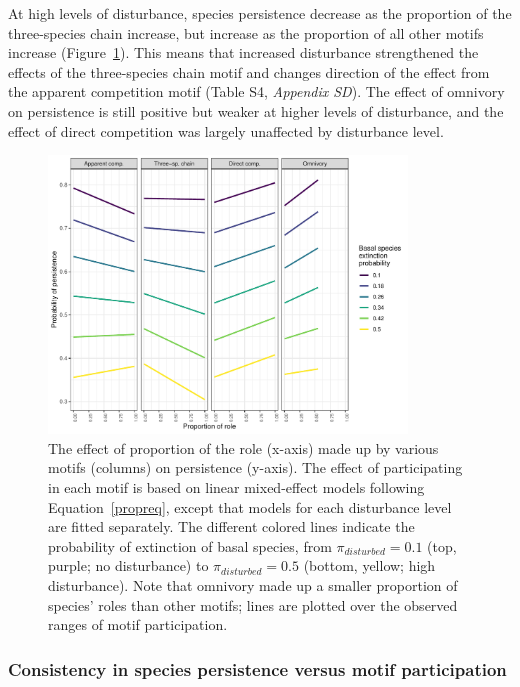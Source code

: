\documentclass[12pt]{article}
\begin{document}
\begin{spacing}{2.0}
        At high levels of disturbance, species persistence decrease as the proportion of the three-species chain increase, but increase as the proportion of all other motifs increase (Figure~\ref{fig:prop_lmer_all}). This means that increased disturbance strengthened the effects of the three-species chain motif and changes direction of the effect from the apparent competition motif  (Table S4, \emph{Appendix SD}). The effect of omnivory on persistence is still positive but weaker at higher levels of disturbance, and the effect of direct competition was largely unaffected by disturbance level.
    
            
            \begin{figure}[h!]
                \centering
                \includegraphics[width=0.85\textwidth]{figures/prop_lmer_allCS.pdf}
                \caption{The effect of proportion of the role (x-axis) made up by various motifs (columns) on persistence (y-axis). The effect of participating in each motif is based on linear mixed-effect models following Equation~\ref{propreq}, except that models for each  disturbance level are fitted separately. The different colored lines indicate the probability of extinction of basal species, from $\pi_{disturbed} = 0.1$ (top, purple; no disturbance) to $\pi_{disturbed} = 0.5$ (bottom, yellow; high disturbance). Note that omnivory made up a smaller proportion of species' roles than other motifs; lines are plotted over the observed ranges of motif participation.}
                \label{fig:prop_lmer_all}
            \end{figure}
        
        \clearpage
    
        \subsubsection*{Consistency in species persistence versus motif participation}


\end{spacing}
\end{document}
